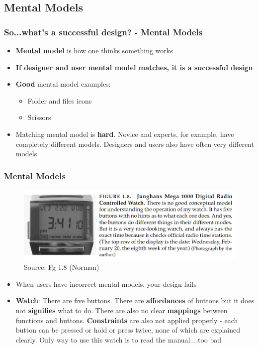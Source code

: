 \documentclass{beamer}
\begin{document}
\subsection{Mental Models}
\begin{frame}
\frametitle{So...what's a successful design?  - Mental Models}
\begin{itemize}
	\item \textbf{Mental model} is how one thinks something works
	\item \textbf{If designer and user mental model matches, it is a successful design}
	\item \textbf{Good} mental model examples: 
	\begin{itemize}
		\item Folder and files icons
		\item Scissors
	\end{itemize}		
	\item Matching mental model is \textbf{hard}.  Novice and experts, for example, have completely different models.   Designers and users also have often very different models
\end{itemize}
\end{frame}


\begin{frame}
\frametitle{Mental Models}
\centering
\begin{figure}
	\includegraphics[width=0.6\linewidth]{model}
	\caption{Source: Fg 1.8 (Norman)}
\end{figure}
\vspace{-10pt}
\begin{itemize}
	\item When users have incorrect mental models, your design fails
	\item \textbf{Watch}: There are five buttons.  There are \textbf{affordances} of buttons but it does not \textbf{signifies} what to do.  There are also no clear \textbf{mappings} between functions and buttons.   \textbf{Constraints} are also not applied properly - each button can be pressed or hold or press twice, none of which are explained clearly.   Only way to use this watch is to read the manual....too bad
\end{itemize}
\end{frame}
\end{document}
